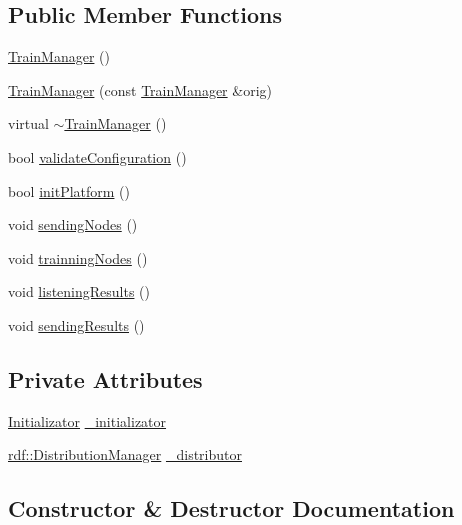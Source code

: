 \subsection*{Public Member Functions}
\begin{DoxyCompactItemize}
\item 
\hyperlink{classrdf_1_1TrainManager_aa126c69e975565b712202575403e189d}{Train\+Manager} ()
\item 
\hyperlink{classrdf_1_1TrainManager_a272ec0a42eb1c8e2ce41d59a9be39096}{Train\+Manager} (const \hyperlink{classrdf_1_1TrainManager}{Train\+Manager} \&orig)
\item 
virtual \hyperlink{classrdf_1_1TrainManager_a8e9a9f877844e8872381a3d7fd313a05}{$\sim$\+Train\+Manager} ()
\item 
bool \hyperlink{classrdf_1_1TrainManager_af04c572243a764b0e2f07fba8859357e}{validate\+Configuration} ()
\item 
bool \hyperlink{classrdf_1_1TrainManager_af9ed24bf58b85b5224bdad26e666b31d}{init\+Platform} ()
\item 
void \hyperlink{classrdf_1_1TrainManager_a6adb0ac9182c270354c9224198d93d82}{sending\+Nodes} ()
\item 
void \hyperlink{classrdf_1_1TrainManager_ac8913daa4b19cb100101c591516c1351}{trainning\+Nodes} ()
\item 
void \hyperlink{classrdf_1_1TrainManager_a8884b6fd03b2e74d29d80b11b97428ca}{listening\+Results} ()
\item 
void \hyperlink{classrdf_1_1TrainManager_a17295a301b3affd89f44911b0bf36c27}{sending\+Results} ()
\end{DoxyCompactItemize}
\subsection*{Private Attributes}
\begin{DoxyCompactItemize}
\item 
\hyperlink{classrdf_1_1Initializator}{Initializator} \hyperlink{classrdf_1_1TrainManager_a927ff849445fee16860fbb41c774554c}{\+\_\+initializator}
\item 
\hyperlink{classrdf_1_1DistributionManager}{rdf\+::\+Distribution\+Manager} \hyperlink{classrdf_1_1TrainManager_aa0755d00120e30bb7317dae406758c44}{\+\_\+distributor}
\end{DoxyCompactItemize}


\subsection{Constructor \& Destructor Documentation}
